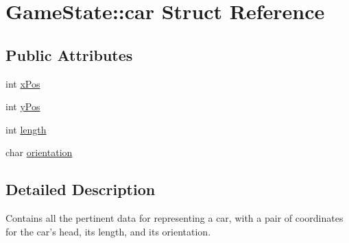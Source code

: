 \hypertarget{struct_game_state_1_1car}{\section{\-Game\-State\-:\-:car \-Struct \-Reference}
\label{struct_game_state_1_1car}
}
\subsection*{\-Public \-Attributes}
\begin{DoxyCompactItemize}
\item 
int \hyperlink{struct_game_state_1_1car_afba0a0a1c151a2aee7f34f2b7827c0af}{x\-Pos}
\item 
int \hyperlink{struct_game_state_1_1car_a789d8e3d1ea009cf7450adfc10df4b41}{y\-Pos}
\item 
int \hyperlink{struct_game_state_1_1car_a8a99c3e1010b5f8e8fca461a1e5c567f}{length}
\item 
char \hyperlink{struct_game_state_1_1car_ac0effead63018546a522b068b5d01cfc}{orientation}
\end{DoxyCompactItemize}


\subsection{\-Detailed \-Description}
\-Contains all the pertinent data for representing a car, with a pair of coordinates for the car's head, its length, and its orientation. 

